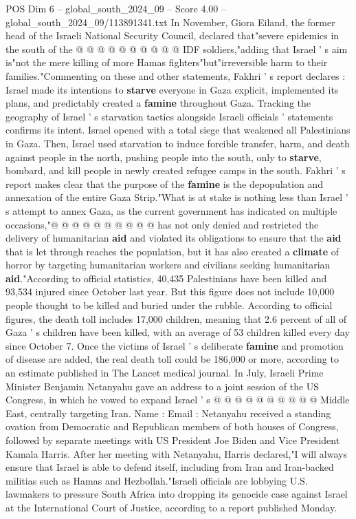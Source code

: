 \begin{textsample}{POS Dim 6 – global\_south\_2024\_09 – Score 4.00 – global\_south\_2024\_09/113891341.txt}
In November, Giora Eiland, the former head of the Israeli National Security Council, declared that"severe epidemics in the south of the @ @ @ @ @ @ @ @ @ @ IDF soldiers,"adding that Israel ' s aim is"not the mere killing of more Hamas fighters"but"irreversible harm to their families."Commenting on these and other statements, Fakhri ' s report declares : Israel made its intentions to \textbf{starve} everyone in Gaza explicit, implemented its plans, and predictably created a \textbf{famine} throughout Gaza.
Tracking the geography of Israel ' s starvation tactics alongside Israeli officials ' statements confirms its intent.
Israel opened with a total siege that weakened all Palestinians in Gaza.
Then, Israel used starvation to induce forcible transfer, harm, and death against people in the north, pushing people into the south, only to \textbf{starve}, bombard, and kill people in newly created refugee camps in the south.
Fakhri ' s report makes clear that the purpose of the \textbf{famine} is the depopulation and annexation of the entire Gaza Strip."What is at stake is nothing less than Israel ' s attempt to annex Gaza, as the current government has indicated on multiple occasions,"@ @ @ @ @ @ @ @ @ @ has not only denied and restricted the delivery of humanitarian \textbf{aid} and violated its obligations to ensure that the \textbf{aid} that is let through reaches the population, but it has also created a \textbf{climate} of horror by targeting humanitarian workers and civilians seeking humanitarian \textbf{aid}."According to official statistics, 40,435 Palestinians have been killed and 93,534 injured since October last year.
But this figure does not include 10,000 people thought to be killed and buried under the rubble.
According to official figures, the death toll includes 17,000 children, meaning that 2.6 percent of all of Gaza ' s children have been killed, with an average of 53 children killed every day since October 7.
Once the victims of Israel ' s deliberate \textbf{famine} and promotion of disease are added, the real death toll could be 186,000 or more, according to an estimate published in The Lancet medical journal.
In July, Israeli Prime Minister Benjamin Netanyahu gave an address to a joint session of the US Congress, in which he vowed to expand Israel ' s @ @ @ @ @ @ @ @ @ @ Middle East, centrally targeting Iran.
Name : Email : Netanyahu received a standing ovation from Democratic and Republican members of both houses of Congress, followed by separate meetings with US President Joe Biden and Vice President Kamala Harris.
After her meeting with Netanyahu, Harris declared,"I will always ensure that Israel is able to defend itself, including from Iran and Iran-backed militias such as Hamas and Hezbollah."Israeli officials are lobbying U.S. lawmakers to pressure South Africa into dropping its genocide case against Israel at the International Court of Justice, according to a report published Monday.

\end{textsample}
